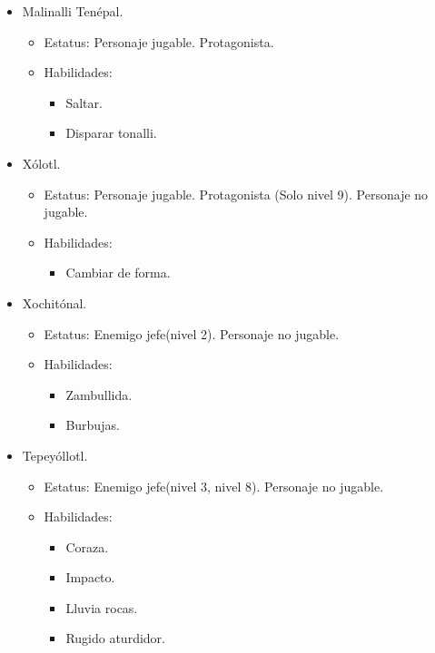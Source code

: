 	\begin{itemize}
		\item Malinalli Tenépal.
			\begin{itemize}
				\item Estatus: Personaje jugable. Protagonista.
				\item Habilidades: 
					\begin{itemize}
						\item Saltar.
						\item Disparar tonalli.
					\end{itemize}
			\end{itemize}
		\item Xólotl.
			\begin{itemize}
				\item Estatus: Personaje jugable. Protagonista (Solo nivel 9). Personaje no jugable.
				\item Habilidades: 
					\begin{itemize}
						\item Cambiar de forma.
					\end{itemize}
			\end{itemize}
		\item Xochitónal.
			\begin{itemize}
				\item Estatus: Enemigo jefe(nivel 2). Personaje no jugable.
				\item Habilidades: 
					\begin{itemize}
						\item Zambullida.
						\item Burbujas.
					\end{itemize}
			\end{itemize}
		\item Tepeyóllotl.
			\begin{itemize}
				\item Estatus: Enemigo jefe(nivel 3, nivel 8). Personaje no jugable.
				\item Habilidades: 
					\begin{itemize}
						\item Coraza.
						\item Impacto.
						\item Lluvia rocas.
						\item Rugido aturdidor.
					\end{itemize}

\end{itemize}
\end{itemize}
